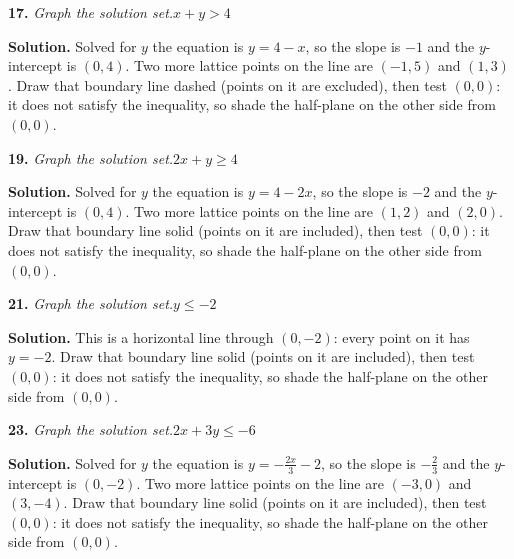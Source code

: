 \documentclass{ximera}
\begin{document}
\begin{problem}
\textbf{17.} \emph{Graph the solution set.}\quad $x + y > 4$               \figbox{\gridsm}

\begin{hint}
\textbf{Solution.} Solved for $y$ the equation is $y=4 - x$, so the slope is $-1$ and the $y$-intercept is $(0,4)$. Two more lattice points on the line are $(-1,5)$ and $(1,3)$. Draw that boundary line dashed (points on it are excluded), then test $(0,0)$: it does not satisfy the inequality, so shade the half-plane on the other side from $(0,0)$.
\end{hint}
\end{problem}

\begin{problem}
\textbf{19.} \emph{Graph the solution set.}\quad $2x + y \ge 4$            \figbox{\gridsm}

\begin{hint}
\textbf{Solution.} Solved for $y$ the equation is $y=4 - 2x$, so the slope is $-2$ and the $y$-intercept is $(0,4)$. Two more lattice points on the line are $(1,2)$ and $(2,0)$. Draw that boundary line solid (points on it are included), then test $(0,0)$: it does not satisfy the inequality, so shade the half-plane on the other side from $(0,0)$.
\end{hint}
\end{problem}

\begin{problem}
\textbf{21.} \emph{Graph the solution set.}\quad $y \le -2$                \figbox{\gridsm}

\begin{hint}
\textbf{Solution.} This is a horizontal line through $(0,-2)$: every point on it has $y=-2$. Draw that boundary line solid (points on it are included), then test $(0,0)$: it does not satisfy the inequality, so shade the half-plane on the other side from $(0,0)$.
\end{hint}
\end{problem}

\begin{problem}
\textbf{23.} \emph{Graph the solution set.}\quad $2x + 3y \le -6$          \figbox{\gridsm}

\begin{hint}
\textbf{Solution.} Solved for $y$ the equation is $y=-\frac{2x}{3} - 2$, so the slope is $-\frac{2}{3}$ and the $y$-intercept is $(0,-2)$. Two more lattice points on the line are $(-3,0)$ and $(3,-4)$. Draw that boundary line solid (points on it are included), then test $(0,0)$: it does not satisfy the inequality, so shade the half-plane on the other side from $(0,0)$.
\end{hint}
\end{problem}
\end{document}
